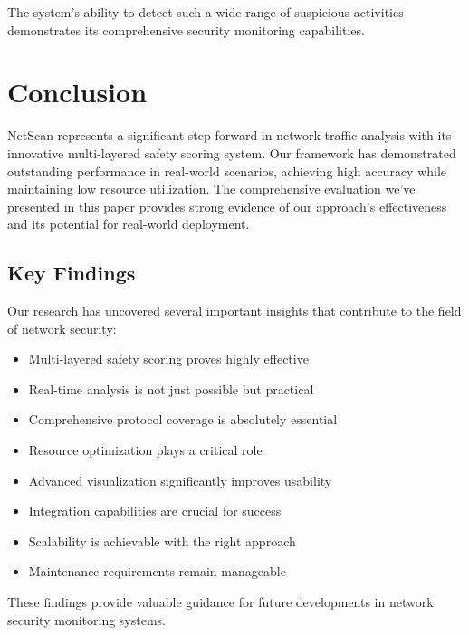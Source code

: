 \documentclass[conference]{IEEEtran}
\newcommand{\netscan}{NetScan}
\begin{document}
The system's ability to detect such a wide range of suspicious activities demonstrates its comprehensive security monitoring capabilities.

\section{Conclusion}
\label{sec:conclusion}

\netscan{} represents a significant step forward in network traffic analysis with its innovative multi-layered safety scoring system. Our framework has demonstrated outstanding performance in real-world scenarios, achieving high accuracy while maintaining low resource utilization. The comprehensive evaluation we've presented in this paper provides strong evidence of our approach's effectiveness and its potential for real-world deployment.

\subsection{Key Findings}
Our research has uncovered several important insights that contribute to the field of network security:

\begin{itemize}[leftmargin=*]
    \item Multi-layered safety scoring proves highly effective
    \item Real-time analysis is not just possible but practical
    \item Comprehensive protocol coverage is absolutely essential
    \item Resource optimization plays a critical role
    \item Advanced visualization significantly improves usability
    \item Integration capabilities are crucial for success
    \item Scalability is achievable with the right approach
    \item Maintenance requirements remain manageable
\end{itemize}

These findings provide valuable guidance for future developments in network security monitoring systems.
\end{document}
